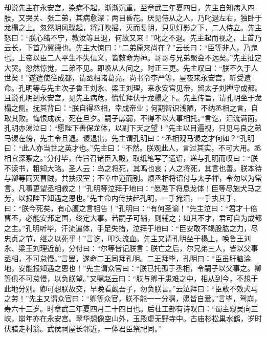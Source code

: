 却说先主在永安宫，染病不起，渐渐沉重，至章武三年夏四日，先主自知病入四肢，又哭关、张二弟，其病愈深：两目昏花。厌见侍从之人，乃叱退左右，独卧于龙榻之上。忽然阴风骤起，将灯吹摇，灭而复明，只见灯影之下，二人侍立。先主怒曰：“朕心绪不宁，教汝等且退，何故又来！”叱之不退。先主起而视之，上首乃云长，下首乃翼德也。先主大惊曰：“二弟原来尚在？”云长曰：“臣等非人，乃鬼也。上帝以臣二人平生不失信义，皆敕命为神。哥哥与兄弟聚会不远矣。”先主扯定大哭。忽然惊觉，二弟不见。即唤从人问之，时正三更。先主叹曰：“朕不久于人世矣！”遂遣使往成都，请丞相诸葛亮，尚书令李严等，星夜来永安宫，听受遗命。孔明等与先主次子鲁王刘永、梁王刘理，来永安宫见帝，留太子刘禅守成都。且说孔明到永安宫，见先主病危，慌忙拜伏于龙榻之下。先主传旨，请孔明坐于龙榻之侧。抚其背曰：“朕自得丞相，幸成帝业；何期智识浅陋，不纳丞相之言，自取其败。悔恨成疾，死在旦夕。嗣子孱弱，不得不以大事相托。”言讫，泪流满面。孔明亦涕泣曰：“愿陛下善保龙体，以副下天之望！”先主以目遍视，只见马良之弟马谡在傍，先主令且退。谡退出，先主谓孔明曰：“丞相观马谡之才何如？”孔明曰：“此人亦当世之英才也。”先主曰：“不然。朕观此人，言过其实，不可大用。丞相宜深察之。”分付毕，传旨召诸臣入殿，取纸笔写了遗诏，递与孔明而叹曰：“朕不读书，粗知大略。圣人云：鸟之将死，其鸣也哀；人之将死，其言也善。朕本待与卿等同灭曹贼，共扶汉室；不幸中道而别。烦丞相将诏付与太子禅，令勿以为常言。凡事更望丞相教之！”孔明等泣拜于地曰：“愿陛下将息龙体！臣等尽施犬马之劳，以报陛下知遇之恩也。”先主命内侍扶起孔明，一手掩泪，一手执其手，曰：“朕今死矣，有心腹之言相告！”孔明曰：“有何圣谕！”先主泣曰：“君才十倍曹丕，必能安邦定国，终定大事。若嗣子可辅，则辅之；如其不才，君可自为成都之主。”孔明听毕，汗流遍体，手足失措，泣拜于地曰：“臣安敢不竭股肱之力，尽忠贞之节，继之以死乎！”言讫，叩头流血。先主又请孔明坐于榻上，唤鲁王刘永、梁王刘理近前，分付曰：“尔等皆记朕言：朕亡之后，尔兄弟三人，皆以父事丞相，不可怠慢。”言罢，遂命二王同拜孔明。二王拜毕，孔明曰：“臣虽肝脑涂地，安能报知遇之恩也！”先主谓众官曰：“朕已托孤于丞相，令嗣子以父事之。卿等俱不可怠慢，以负朕望。”又嘱赵云曰：“朕与卿于患难之中，相从到今，不想于此地分别。卿可想朕故交，早晚看觑吾子，勿负朕言。”云泣拜曰：“臣敢不效犬马之劳！”先主又谓众官曰：“卿等众官，朕不能一一分嘱，愿皆自爱。”言毕，驾崩，寿六十三岁。时章武三年夏四月二十四日也。后杜工部有诗叹曰：“蜀主窥吴向三峡，崩年亦在永安宫。翠华想像空山外，玉殿虚无野寺中。古庙杉松巢水鹤，岁时伏腊走村翁。武侯祠屋长邻近，一体君臣祭祀同。”

